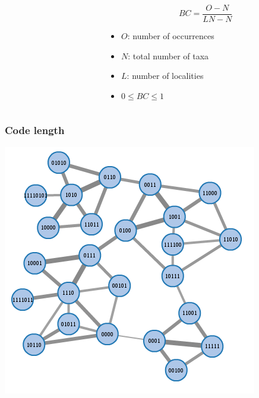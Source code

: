 \documentclass{beamer}
\begin{document}
\begin{frame}
\begin{columns}
\begin{column}{0.6\textwidth}
\begin{center}
        \tiny{}
      \end{center}
    \end{column}
    \begin{column}{0.4\textwidth}
      \[
        BC = \frac{O - N}{LN - N}
      \]

      \begin{itemize}
        \item \(O\): number of occurrences
        \item \(N\): total number of taxa
        \item \(L\): number of localities
        \item \(0 \leq BC \leq 1\)
      \end{itemize}
    \end{column}
  \end{columns}
\end{frame}

\begin{frame}
  \frametitle{Code length}
  \begin{center}
    \includegraphics[height=0.8\textheight,width=\textwidth,keepaspectratio=true]{figure/network_plain}

    \tiny{}
  \end{center}
\end{frame}
\end{document}
